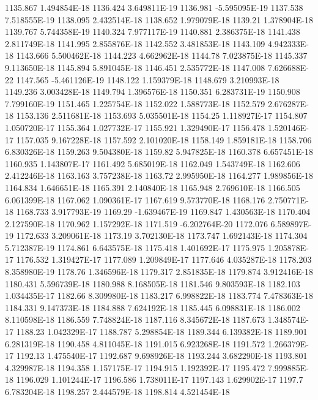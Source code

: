 1135.867  1.494854E-18
1136.424  3.649811E-19
1136.981  -5.595095E-19
1137.538  7.518555E-19
1138.095  2.432514E-18
1138.652  1.979079E-18
1139.21  1.378904E-18
1139.767  5.744358E-19
1140.324  7.977117E-19
1140.881  2.386375E-18
1141.438  2.811749E-18
1141.995  2.855876E-18
1142.552  3.481853E-18
1143.109  4.942333E-18
1143.666  5.500462E-18
1144.223  4.662962E-18
1144.78  7.023875E-18
1145.337  9.113650E-18
1145.894  5.891045E-18
1146.451  2.535772E-18
1147.008  7.626688E-22
1147.565  -5.461126E-19
1148.122  1.159379E-18
1148.679  3.210993E-18
1149.236  3.003428E-18
1149.794  1.396576E-18
1150.351  6.283731E-19
1150.908  7.799160E-19
1151.465  1.225754E-18
1152.022  1.588773E-18
1152.579  2.676287E-18
1153.136  2.511681E-18
1153.693  5.035501E-18
1154.25  1.118927E-17
1154.807  1.050720E-17
1155.364  1.027732E-17
1155.921  1.329490E-17
1156.478  1.520146E-17
1157.035  9.167228E-18
1157.592  2.101020E-18
1158.149  1.859181E-18
1158.706  6.830326E-18
1159.263  9.504380E-18
1159.82  5.947825E-18
1160.378  6.657451E-18
1160.935  1.143807E-17
1161.492  5.685019E-18
1162.049  1.543749E-18
1162.606  2.412246E-18
1163.163  3.757238E-18
1163.72  2.995950E-18
1164.277  1.989856E-18
1164.834  1.646651E-18
1165.391  2.140840E-18
1165.948  2.769610E-18
1166.505  6.061399E-18
1167.062  1.090361E-17
1167.619  9.573770E-18
1168.176  2.750771E-18
1168.733  3.917793E-19
1169.29  -1.639467E-19
1169.847  1.430563E-18
1170.404  2.127590E-18
1170.962  1.157292E-18
1171.519  -6.202764E-20
1172.076  6.589897E-19
1172.633  3.209061E-18
1173.19  3.702130E-18
1173.747  1.692143E-18
1174.304  5.712387E-19
1174.861  6.643575E-18
1175.418  1.401692E-17
1175.975  1.205878E-17
1176.532  1.319427E-17
1177.089  1.209849E-17
1177.646  4.035287E-18
1178.203  8.358980E-19
1178.76  1.346596E-18
1179.317  2.851835E-18
1179.874  3.912416E-18
1180.431  5.596739E-18
1180.988  8.168505E-18
1181.546  9.803593E-18
1182.103  1.034435E-17
1182.66  8.309980E-18
1183.217  6.998822E-18
1183.774  7.478363E-18
1184.331  9.147373E-18
1184.888  7.624192E-18
1185.445  6.098831E-18
1186.002  8.110598E-18
1186.559  7.748824E-18
1187.116  8.345672E-18
1187.673  1.348574E-17
1188.23  1.042329E-17
1188.787  5.298854E-18
1189.344  6.139382E-18
1189.901  6.281319E-18
1190.458  4.811045E-18
1191.015  6.923268E-18
1191.572  1.266379E-17
1192.13  1.475540E-17
1192.687  9.698926E-18
1193.244  3.682290E-18
1193.801  4.329987E-18
1194.358  1.157175E-17
1194.915  1.192392E-17
1195.472  7.999885E-18
1196.029  1.101244E-17
1196.586  1.738011E-17
1197.143  1.629902E-17
1197.7  6.783204E-18
1198.257  2.444579E-18
1198.814  4.521454E-18

